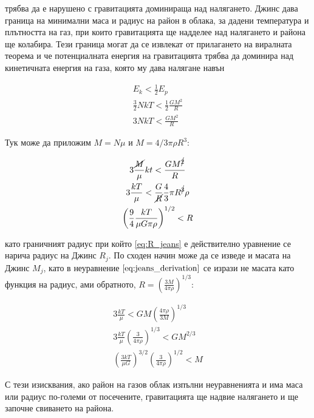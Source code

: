 \documentclass[a4paper,12pt]{article}
\begin{document}
трябва да е нарушено с гравитацията доминираща над налягането. Джинс дава граница на минимални маса и радиус на район в облака, за дадени температура и плътността на газ, при които гравитацията ще надделее над налягането и района ще колабира. Тези граница могат да се извлекат от прилагането на виралната теорема и че потенциалната енергия на гравитацията трябва да доминира над кинетичната енергия на газа, която му дава налягане навън

\begin{gather}
    E_k < \frac{1}{2}E_p\\
    \frac{3}{2}NkT < \frac{1}{2}\frac{GM^2}{R}\\
    3NkT < \frac{GM^2}{R}
\end{gather}

Тук може да приложим $M=N\mu$ и $M=4/3 \pi \rho R^3$:

\begin{gather}
    \label{eq:jeans_derivation}
    3\frac{\cancel{M}}{\mu}kt < \frac{GM^{\cancel{2}}}{R}\\
    3\frac{kT}{\mu} < \frac{G}{\cancel{R}} \frac{4}{3}\pi R^{\cancel{3}} \rho\\
    \left( \frac{9}{4} \frac{kT}{\mu G\pi \rho} \right)^{1/2} < R
    \label{eq:R_jeans}
\end{gather}

като граничният радиус при който \eqref{eq:R_jeans} е действително уравнение се нарича радиус на Джинс $R_j$. По сходен начин може да се изведе и масата на Джинс $M_j$, като в неуравнение $\eqref{eq:jeans_derivation}$ се изрази не масата като функция на радиус, ами обратното, $R=(\frac{3M}{4\pi \rho})^{1/3}$:

\begin{gather}
    3\frac{kT}{\mu} < GM \left( \frac{4\pi \rho}{3M} \right)^{1/3}\\
    3\frac{kT}{\mu} \left( \frac{3}{4\pi \rho} \right)^{1/3} < GM^{2/3}\\
    \left( \frac{3kT}{\mu G} \right)^{3/2} \left( \frac{3}{4\pi \rho} \right)^{1/2} < M
\end{gather}

С тези изисквания, ако район на газов облак изпълни неуравненията и има маса или радиус по-големи от посечените, гравитацията ще надвие налягането и ще започне свиването на района.\\
\end{document}
